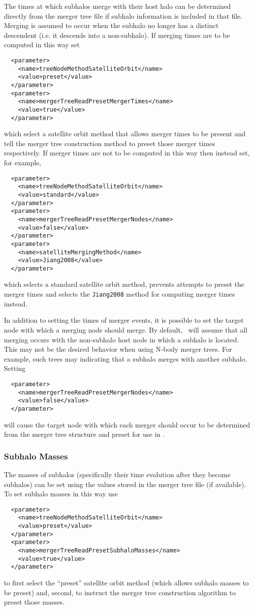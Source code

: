 The times at which subhalos merge with their host halo can be determined directly from the merger tree file if subhalo information is included in that file. Merging is assumed to occur when the subhalo no longer has a distinct descendent (i.e. it descends into a non-subhalo). If merging times are to be computed in this way set
\begin{verbatim}
  <parameter>
    <name>treeNodeMethodSatelliteOrbit</name>
    <value>preset</value>    
  </parameter>
  <parameter>
    <name>mergerTreeReadPresetMergerTimes</name>
    <value>true</value>    
  </parameter>
\end{verbatim}
which select a satellite orbit method that allows merger times to be present and tell the merger tree construction method to preset those merger times respectively. If merger times are not to be computed in this way then instead set, for example,
\begin{verbatim}
  <parameter>
    <name>treeNodeMethodSatelliteOrbit</name>
    <value>standard</value>    
  </parameter>
  <parameter>
    <name>mergerTreeReadPresetMergerNodes</name>
    <value>false</value>
  </parameter>
  <parameter>
    <name>satelliteMergingMethod</name>
    <value>Jiang2008</value>
  </parameter>
\end{verbatim}
which selects a standard satellite orbit method, prevents attempts to preset the merger times and selects the {\tt Jiang2008} method for computing merger times instead.

In addition to setting the times of merger events, it is possible to set the target node with which a merging node should merge. By default, \glc\ will assume that all merging occurs with the non-subhalo host node in which a subhalo is located. This may not be the desired behavior when using N-body merger trees. For example, such trees may indicating that a subhalo merges with another subhalo. Setting
\begin{verbatim}
  <parameter>
    <name>mergerTreeReadPresetMergerNodes</name>
    <value>false</value>
  </parameter>
\end{verbatim}
will cause the target node with which each merger should occur to be determined from the merger tree structure and preset for use in \glc.

\subsubsection{Subhalo Masses}

The masses of subhalos (specifically their time evolution after they become subhalos) can be set using the values stored in the merger tree file (if available). To set subhalo masses in this way use
\begin{verbatim}
  <parameter>
    <name>treeNodeMethodSatelliteOrbit</name>
    <value>preset</value>    
  </parameter>
  <parameter>
    <name>mergerTreeReadPresetSubhaloMasses</name>
    <value>true</value>
  </parameter>
\end{verbatim}
to first select the ``preset'' satellite orbit method (which allows subhalo masses to be preset) and, second, to instruct the merger tree construction algorithm to preset those masses.

